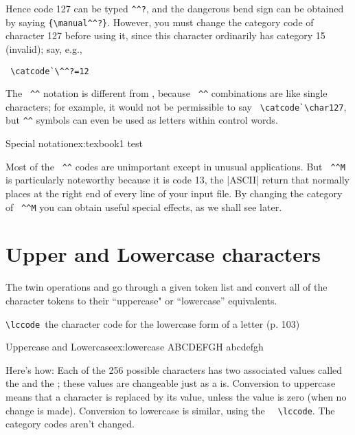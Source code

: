 Hence code 127 can be typed \verb+^^?+, and
the dangerous bend sign can be obtained by saying \verb+{\manual^^?}+. However, you must
change the category code of character 127 before using it, since this character ordinarily
has category 15 (invalid); say, e.g., 

\verb+ \catcode`\^^?=12 +

The \verb+ ^^+ notation is different from
\cmd{\char}, because \verb+ ^^+ combinations are like single characters; for example, it would not
be permissible to say \verb+ \catcode`\char127+, but \verb+^^+ symbols can even be used as letters within control words.

\begin{texexample}{Special notation}{ex:texbook1}
\def\^^zz{test}
\^^zz
\end{texexample}


Most of the \verb+ ^^+ codes are unimportant except in unusual applications. But
\verb+ ^^M+ is particularly noteworthy because it is code 13, the |ASCII| return that
\tex normally places at the right end of every line of your input file. By changing the
category of \verb+ ^^M+  you can obtain useful special effects, as we shall see later.

\section{Upper and Lowercase characters}



The twin operations  and 
go through a given token list and convert all of the character tokens to their
``uppercase"  or ``lowercase'' equivalents.

\verb*+\lccode +the character code for the lowercase form of a letter (p. 103)

\begin{texexample}{Uppercase and Lowercase}{ex:lowercase} 
\uppercase{abcdefgh} 
\lowercase{ABCDEFGH}
\end{texexample}

Here's how: Each of the 256 possible characters has two associated values called the \cmd{\uccode} and the \cmd{\lccode}; these values are
changeable just as a \cmd{\catcode} is. Conversion to uppercase means that a character
is replaced by its \cmd{\uccode} value, unless the \cmd{\uccode} value is zero (when no change
is made). Conversion to lowercase is similar, using the
\verb+  \lccode+. The category codes
aren't changed. 

